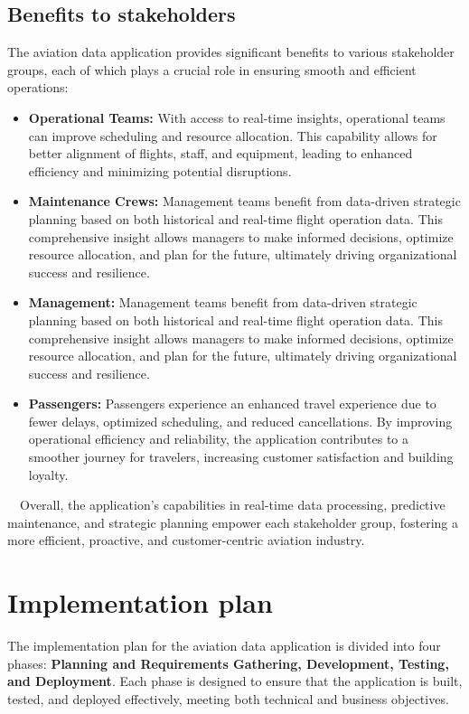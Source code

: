 \documentclass[12pt,a4paper]{article}
\begin{document}
\subsection{Benefits to stakeholders}
The aviation data application provides significant benefits to various
stakeholder groups, each of which plays a crucial role in ensuring smooth and
efficient operations:

\begin{itemize}
    \item \textbf{Operational Teams:} With access to real-time insights,
    operational teams can improve scheduling and resource allocation. This
    capability allows for better alignment of flights, staff, and equipment,
    leading to enhanced efficiency and minimizing potential disruptions.
    \item \textbf{Maintenance Crews:} Management teams benefit from data-driven
    strategic planning based on both historical and real-time flight operation
    data. This comprehensive insight allows managers to make informed decisions,
    optimize resource allocation, and plan for the future, ultimately driving
    organizational success and resilience.
    \item \textbf{Management:} Management teams benefit from data-driven
    strategic planning based on both historical and real-time flight operation
    data. This comprehensive insight allows managers to make informed decisions,
    optimize resource allocation, and plan for the future, ultimately driving
    organizational success and resilience.
    \item \textbf{Passengers:} Passengers experience an enhanced travel
    experience due to fewer delays, optimized scheduling, and reduced
    cancellations. By improving operational efficiency and reliability, the
    application contributes to a smoother journey for travelers, increasing
    customer satisfaction and building loyalty.
\end{itemize}
$\quad$Overall, the application’s capabilities in real-time data processing,
predictive maintenance, and strategic planning empower each stakeholder group,
fostering a more efficient, proactive, and customer-centric aviation industry.

\section{Implementation plan}
The implementation plan for the aviation data application is divided into four
phases: \textbf{Planning and Requirements Gathering, Development, Testing, and
Deployment}. Each phase is designed to ensure that the application is built,
tested, and deployed effectively, meeting both technical and business
objectives.
\end{document}
